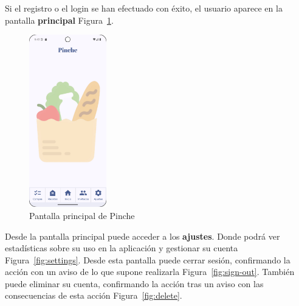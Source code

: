 \clearpage
Si el registro o el login se han efectuado con éxito, el usuario aparece en la pantalla \textbf{principal} Figura~\ref{fig:main}.

\begin{figure}[H]
\centering
\includegraphics[width=0.3\textwidth]{./img/manual/pinche_home.png}
\caption{Pantalla principal de Pinche}
\label{fig:main}
\end{figure}

\clearpage
Desde la pantalla principal puede acceder a los \textbf{ajustes}. Donde podrá ver estadísticas sobre su uso en la aplicación y gestionar su cuenta Figura~\ref{fig:settings}. Desde esta pantalla puede cerrar sesión, confirmando la acción con un aviso de lo que supone realizarla Figura~\ref{fig:sign-out}. También puede eliminar su cuenta, confirmando la acción tras un aviso con las consecuencias de esta acción Figura~\ref{fig:delete}.

